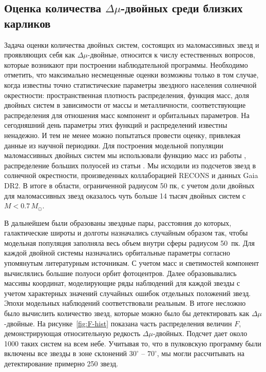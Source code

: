 \subsection{Оценка количества $\Delta\mu$-двойных среди близких карликов}\label{subsec:ch1/sect3/sub2}
Задача оценки количества двойных систем, состоящих из маломассивных звезд и проявляющих себя как $\Delta\mu$-двойные, относится к числу естественных вопросов, которые возникают при построении наблюдательной программы. Необходимо отметить, что максимально несмещенные оценки возможны только в том случае, когда известны  точно статистические параметры звездного населения солнечной окрестности: пространственная плотность распределения, функция  масс, доля двойных систем в зависимости от массы и металличности, соответствующие распределения для отношения масс компонент и орбитальных параметров. На сегодняшний день параметры этих функций и распределений известны ненадежно. И тем не менее можно попытаться провести оценку, привлекая данные из научной периодики. Для построения модельной популяции маломассивных двойных систем мы использовали функцию масс из работы \cite{2005ASSL..327...41C},
распределение больших полуосей из статьи \cite{2010ApJS..190....1R}. Мы исходили из подсчетов звезд в солнечной окрестности, произведенных коллаборацией RECONS \cite{2019AJ....157..216W} и данных Gaia DR2. В итоге в области, ограниченной радиусом 50 пк, с учетом доли двойных для маломассивных звезд оказалось чуть больше 14 тысяч двойных систем с $M<0.7\,M_\odot$. 

В дальнейшем были образованы звездные пары, расстояния до которых, галактические широты и долготы назначались случайным образом так, чтобы модельная популяция заполняла весь объем внутри сферы радиусом 50~пк. Для каждой двойной системы назначались орбитальные параметры согласно упомянутым литературным источникам. С учетом масс и светимостей компонент вычислялись большие полуоси орбит фотоцентров. Далее образовывались массивы координат, моделирующие ряды наблюдений для каждой звезды с учетом характерных значений случайных ошибок отдельных положений звезд. Эпохи модельных наблюдений соответствовали реальным. В итоге несложно было вычислить количество звезд, которые можно было бы детектировать как $\Delta\mu$-двойные.  На рисунке~\ref{fig:F-hist} показана часть распределения величин $F$, демонстрирующая относительную редкость $\Delta\mu$-двойных. Подсчет дает около 1000 таких систем на всем небе. Учитывая то, что в пулковскую программу были включены все звезды в зоне склонений	$30^\circ$ -- $70^\circ$, мы могли рассчитывать на детектирование примерно 250 звезд. 

